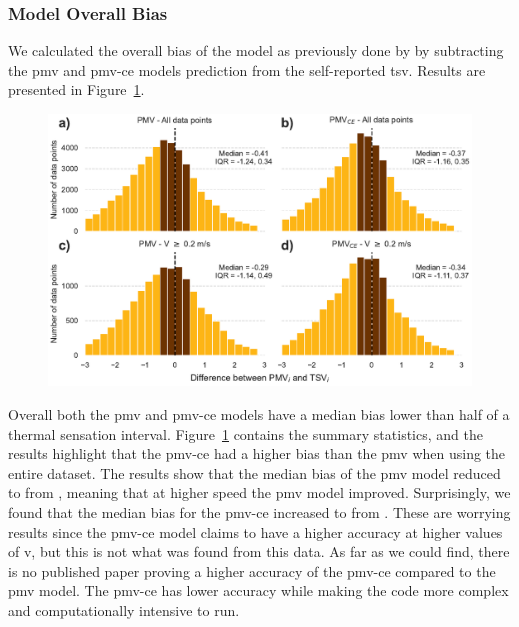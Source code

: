\subsubsection{Model Overall Bias}\label{subsec:model-overall-bias}
We calculated the overall bias of the model as previously done by  by subtracting the \ac{pmv} and  \ac{pmv-ce} models prediction from the self-reported \ac{tsv}.
Results are presented in Figure~\ref{fig:hist_discrepancies}.
\begin{figure}[htb!]
    \centering
    \includegraphics[width=\textwidth]{figures/hist_discrepancies}
    \caption{}
    \label{fig:hist_discrepancies}
\end{figure} 
Overall both the \ac{pmv} and \ac{pmv-ce} models have a median bias lower than half of a thermal sensation interval.
Figure~\ref{fig:hist_discrepancies} contains the summary statistics, and the results highlight that the \ac{pmv-ce} had a higher bias than the \ac{pmv} when using the entire dataset.
The results show that the median bias of the \ac{pmv} model reduced to  from , meaning that at higher speed the \ac{pmv} model improved.
Surprisingly, we found that the median bias for the \ac{pmv-ce} increased to  from .
These are worrying results since the \ac{pmv-ce} model claims to have a higher accuracy at higher values of \ac{v}, but this is not what was found from this data.
As far as we could find, there is no published paper proving a higher accuracy of the \ac{pmv-ce} compared to the \ac{pmv} model. 
The \ac{pmv-ce} has lower accuracy while making the code more complex and computationally intensive to run.

